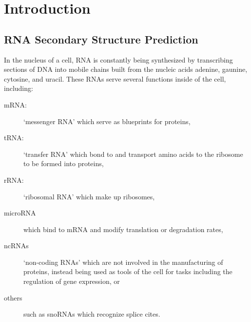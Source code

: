 \newcommand{\stack}[2]{\begin{array}{c}{ #1 \\ #2 }\end{array}}

\chapter{Introduction}

\section{RNA Secondary Structure Prediction}

In the nucleus of a cell, RNA is constantly being synthesized by
transcribing sections of DNA into mobile chains built from the nucleic
acids adenine, gaunine, cytosine, and uracil. These RNAs serve several
functions inside of the cell, including:

\begin{description}
\item[mRNA:] `messenger RNA' which serve as blueprints for
  proteins,
\item[tRNA:] `transfer RNA' which bond to and transport amino acids
  to the ribosome to be formed into proteins,
\item[rRNA:] `ribosomal RNA' which make up ribosomes,
\item[microRNA] which bind to mRNA and modify translation or
  degradation rates, 
\item[ncRNAs] `non-coding RNAs'  which are not involved in the
  manufacturing of proteins, instead being used as tools of the cell
  for tasks including the regulation of gene expression, or
\item[others] such as snoRNAs which recognize splice cites.
\end{description} 

